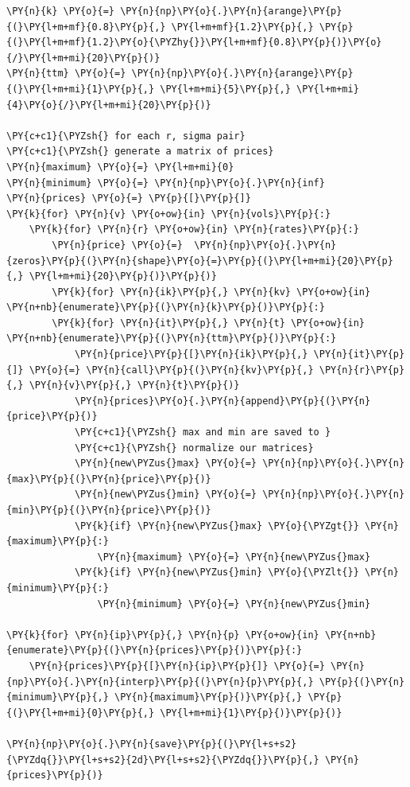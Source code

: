 \begin{codebox}[breakable, size=fbox, boxrule=1pt, pad at break*=1mm,colback=cellbackground, colframe=cellborder]
\begin{Verbatim}[commandchars=\\\{\}]
\PY{n}{k} \PY{o}{=} \PY{n}{np}\PY{o}{.}\PY{n}{arange}\PY{p}{(}\PY{l+m+mf}{0.8}\PY{p}{,} \PY{l+m+mf}{1.2}\PY{p}{,} \PY{p}{(}\PY{l+m+mf}{1.2}\PY{o}{\PYZhy{}}\PY{l+m+mf}{0.8}\PY{p}{)}\PY{o}{/}\PY{l+m+mi}{20}\PY{p}{)}
\PY{n}{ttm} \PY{o}{=} \PY{n}{np}\PY{o}{.}\PY{n}{arange}\PY{p}{(}\PY{l+m+mi}{1}\PY{p}{,} \PY{l+m+mi}{5}\PY{p}{,} \PY{l+m+mi}{4}\PY{o}{/}\PY{l+m+mi}{20}\PY{p}{)}
	
\PY{c+c1}{\PYZsh{} for each r, sigma pair}
\PY{c+c1}{\PYZsh{} generate a matrix of prices}
\PY{n}{maximum} \PY{o}{=} \PY{l+m+mi}{0}
\PY{n}{minimum} \PY{o}{=} \PY{n}{np}\PY{o}{.}\PY{n}{inf}
\PY{n}{prices} \PY{o}{=} \PY{p}{[}\PY{p}{]}
\PY{k}{for} \PY{n}{v} \PY{o+ow}{in} \PY{n}{vols}\PY{p}{:}
    \PY{k}{for} \PY{n}{r} \PY{o+ow}{in} \PY{n}{rates}\PY{p}{:}
        \PY{n}{price} \PY{o}{=}  \PY{n}{np}\PY{o}{.}\PY{n}{zeros}\PY{p}{(}\PY{n}{shape}\PY{o}{=}\PY{p}{(}\PY{l+m+mi}{20}\PY{p}{,} \PY{l+m+mi}{20}\PY{p}{)}\PY{p}{)}
        \PY{k}{for} \PY{n}{ik}\PY{p}{,} \PY{n}{kv} \PY{o+ow}{in} \PY{n+nb}{enumerate}\PY{p}{(}\PY{n}{k}\PY{p}{)}\PY{p}{:}
        \PY{k}{for} \PY{n}{it}\PY{p}{,} \PY{n}{t} \PY{o+ow}{in} \PY{n+nb}{enumerate}\PY{p}{(}\PY{n}{ttm}\PY{p}{)}\PY{p}{:}
            \PY{n}{price}\PY{p}{[}\PY{n}{ik}\PY{p}{,} \PY{n}{it}\PY{p}{]} \PY{o}{=} \PY{n}{call}\PY{p}{(}\PY{n}{kv}\PY{p}{,} \PY{n}{r}\PY{p}{,} \PY{n}{v}\PY{p}{,} \PY{n}{t}\PY{p}{)}
            \PY{n}{prices}\PY{o}{.}\PY{n}{append}\PY{p}{(}\PY{n}{price}\PY{p}{)}
            \PY{c+c1}{\PYZsh{} max and min are saved to }
            \PY{c+c1}{\PYZsh{} normalize our matrices}
            \PY{n}{new\PYZus{}max} \PY{o}{=} \PY{n}{np}\PY{o}{.}\PY{n}{max}\PY{p}{(}\PY{n}{price}\PY{p}{)}
            \PY{n}{new\PYZus{}min} \PY{o}{=} \PY{n}{np}\PY{o}{.}\PY{n}{min}\PY{p}{(}\PY{n}{price}\PY{p}{)}
            \PY{k}{if} \PY{n}{new\PYZus{}max} \PY{o}{\PYZgt{}} \PY{n}{maximum}\PY{p}{:}
                \PY{n}{maximum} \PY{o}{=} \PY{n}{new\PYZus{}max}
            \PY{k}{if} \PY{n}{new\PYZus{}min} \PY{o}{\PYZlt{}} \PY{n}{minimum}\PY{p}{:}
                \PY{n}{minimum} \PY{o}{=} \PY{n}{new\PYZus{}min}
	
\PY{k}{for} \PY{n}{ip}\PY{p}{,} \PY{n}{p} \PY{o+ow}{in} \PY{n+nb}{enumerate}\PY{p}{(}\PY{n}{prices}\PY{p}{)}\PY{p}{:}
    \PY{n}{prices}\PY{p}{[}\PY{n}{ip}\PY{p}{]} \PY{o}{=} \PY{n}{np}\PY{o}{.}\PY{n}{interp}\PY{p}{(}\PY{n}{p}\PY{p}{,} \PY{p}{(}\PY{n}{minimum}\PY{p}{,} \PY{n}{maximum}\PY{p}{)}\PY{p}{,} \PY{p}{(}\PY{l+m+mi}{0}\PY{p}{,} \PY{l+m+mi}{1}\PY{p}{)}\PY{p}{)}
	
\PY{n}{np}\PY{o}{.}\PY{n}{save}\PY{p}{(}\PY{l+s+s2}{\PYZdq{}}\PY{l+s+s2}{2d}\PY{l+s+s2}{\PYZdq{}}\PY{p}{,} \PY{n}{prices}\PY{p}{)}
\end{Verbatim}
\end{codebox}

